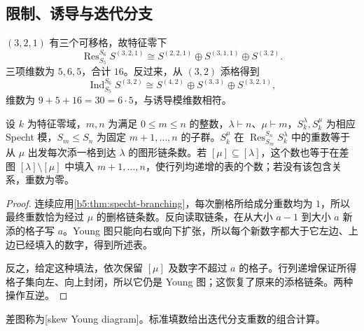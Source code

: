 \subsection{限制、诱导与迭代分支}
\label{b5:subsec:0606:02}

\((3,2,1)\) 有三个可移格，故特征零下
\[
	\operatorname{Res}_{S_5}^{S_6}S^{(3,2,1)} \cong S^{(2,2,1)}\oplus S^{(3,1,1)}\oplus S^{(3,2)}.
\]
三项维数为 \(5,6,5\)，合计 \(16\)。反过来，从 \((3,2)\) 添格得到
\[
	\operatorname{Ind}_{S_5}^{S_6}S^{(3,2)} \cong S^{(4,2)}\oplus S^{(3,3)}\oplus S^{(3,2,1)},
\]
维数为 \(9+5+16=30=6\cdot5\)，与诱导模维数相符。

\begin{corollary}\label{b5:cor:iterated-specht-branching}
	设 \(k\) 为特征零域，\(m,n\) 为满足 \(0\leq m\leq n\) 的整数，\(\lambda\vdash n\)、\(\mu\vdash m\)，\(S_k^\lambda,S_k^\mu\) 为相应 Specht 模，\(S_m\le S_n\) 为固定 \(m+1,\ldots,n\) 的子群。\(S_k^\mu\) 在 \(\operatorname{Res}_{S_m}^{S_n}S_k^\lambda\) 中的重数等于从 \(\mu\) 出发每次添一格到达 \(\lambda\) 的图形链条数。若 \([\mu]\subseteq[\lambda]\)，这个数也等于在差图 \([\lambda]\setminus[\mu]\) 中填入 \(m+1,\ldots,n\)，使行列均递增的表的个数；若没有该包含关系，重数为零。
\end{corollary}
\begin{proof}
	连续应用\cref{b5:thm:specht-branching}，每次删格所给成分重数均为 \(1\)，所以最终重数恰为经过 \(\mu\) 的删格链条数。反向读取链条，在从大小 \(a-1\) 到大小 \(a\) 新添的格子写 \(a\)。Young 图只能向右或向下扩张，所以每个新数字都大于它左边、上边已经填入的数字，得到所述表。

	反之，给定这种填法，依次保留 \([\mu]\) 及数字不超过 \(a\) 的格子。行列递增保证所得格子集向左、向上封闭，所以它仍是 Young 图；这恢复了原来的添格链条。两种操作互逆。
\end{proof}

差图称为[skew Young diagram]。标准填数给出迭代分支重数的组合计算。


